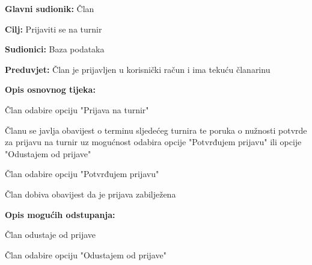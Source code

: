 		\noindent {}
		\begin{packed_item}
			
			\item \textbf{Glavni sudionik: } Član
			\item  \textbf{Cilj: } Prijaviti se na turnir
			\item  \textbf{Sudionici: } Baza podataka
			\item  \textbf{Preduvjet: } Član je prijavljen u korisnički račun i ima tekuću članarinu
			\item  \textbf{Opis osnovnog tijeka:}
			
			\item[] \begin{packed_enum}
				
				\item Član odabire opciju "Prijava na turnir"
				\item Članu se javlja obavijest o terminu sljedećeg turnira te poruka o nužnosti potvrde za prijavu na turnir uz mogućnost odabira opcije "Potvrđujem prijavu" ili opcije "Odustajem od prijave"
				\item Član odabire opciju "Potvrđujem prijavu"
				\item Član dobiva obavijest da je prijava zabilježena
				
			\end{packed_enum}
			
			\item  \textbf{Opis mogućih odstupanja:}
			
			\item[] \begin{packed_item}
				
				\item[2.a] Član odustaje od prijave
				\item[] \begin{packed_enum}
					
					\item Član odabire opciju "Odustajem od prijave"
					
				\end{packed_enum}
				
			\end{packed_item}
		\end{packed_item}
		\eject
	
